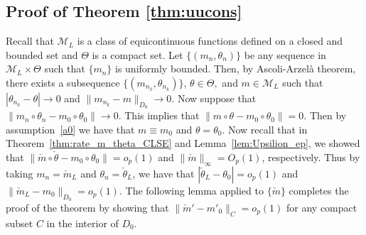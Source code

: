 
\subsection{Proof of Theorem \ref{thm:uucons}}\label{proof:thm:uucons}
Recall that $\mathcal{M}_L$ is a class of   equicontinuous functions defined on a closed and bounded set and $\Theta$ is a compact set.  Let $\{(m_n, \theta_n)\}$ be any sequence  in $\mathcal{M}_L\times \Theta$  such that $\{m_n\}$ is uniformly bounded.   Then, by  Ascoli-Arzel\`{a} theorem, there exists a subsequence $\{(m_{n_k}, \theta_{n_k})\}$, $\theta\in\Theta,$ and $m\in \mathcal{M}_L$ such that $|\theta_{n_k}-\theta| \rightarrow 0$ and $\|m_{n_k}-m\|_{D_0}\rightarrow 0.$
Now suppose that $\|m_n\circ\theta_n - m_0\circ\theta_0\|\rightarrow0$. This implies that $\|m\circ\theta - m_0\circ\theta_0\|=0$.  Then by assumption~\ref{a0} we have that $m\equiv m_0$ and $\theta=\theta_0.$ Now recall that in Theorem~\ref{thm:rate_m_theta_CLSE} and  Lemma~\ref{lem:Upsilion_ep}, we showed that $\|\check{m}\circ\check{\theta} - m_0\circ\theta_0\| = o_p(1)$ and  $\|\check{m}\|_\infty=O_p(1)$, respectively. Thus by taking $m_n = \check{m}_{{L}}$ and $\theta_n = \check{\theta}_{{L}}$, we have that $|\check{\theta}_{{L}} - \theta_0| = o_p(1)$ and $\|\check{m}_{{L}} - m_0\|_{D_0} = o_p(1).$ The following lemma applied to $\{\check{m}\}$ completes the proof of the theorem by showing that $\|\check{m}' - m'_0\|_{C} = o_p(1)$  for any compact subset $C$ in the interior of $D_0$.






